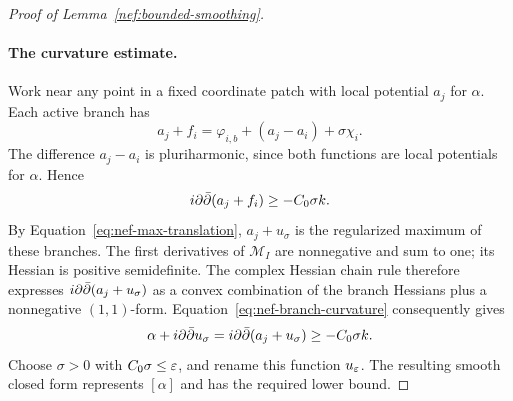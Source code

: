 \begin{proof}[Proof of Lemma~\ref{nef:bounded-smoothing}]
\paragraph{The curvature estimate.}
Work near any point in a fixed
coordinate patch with local potential $a_j$ for $\alpha$.  Each active branch has
\[
 a_j+f_i=\varphi_{i,b}+(a_j-a_i)+\sigma\chi_i.
\]
The difference $a_j-a_i$ is pluriharmonic, since both functions
are local potentials for $\alpha$. Hence
\begin{equation}
 i\partial\bar\partial(a_j+f_i)\geq-C_0\sigma k.
 \label{eq:nef-branch-curvature}
\end{equation}
By Equation~\eqref{eq:nef-max-translation},
$a_j+u_\sigma$ is the regularized maximum of these branches.
The first derivatives of $\mathcal M_I$ are nonnegative and sum
to one; its Hessian is positive semidefinite.  The complex Hessian
chain rule therefore expresses $i\partial\bar\partial(a_j+u_\sigma)$ as a convex
combination of the branch Hessians plus a nonnegative $(1,1)$-form.
Equation~\eqref{eq:nef-branch-curvature} consequently gives
\[
 \alpha+i\partial\bar\partial u_\sigma=i\partial\bar\partial(a_j+u_\sigma)
 \geq-C_0\sigma k.
\]
Choose $\sigma>0$ with $C_0\sigma\leq\varepsilon$, and rename this
function $u_\varepsilon$. The resulting smooth closed form represents
$[\alpha]$ and has the required lower bound.
\end{proof}
